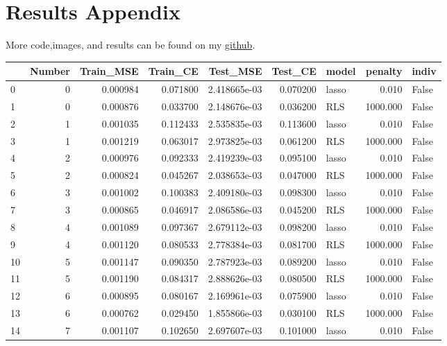 \documentclass[12pt]{article}
\begin{document}
	\section{Results Appendix}
	More code,images, and results can be found on my \href{https://github.com/bogyshi/AMATH563}{github}. 
	\begin{longtable}{lrrrrrlrl}
		\toprule
		{} &  Number &  Train\_MSE &  Train\_CE &      Test\_MSE &   Test\_CE &  model &    penalty &  indiv \\
		\midrule
		0  &       0 &   0.000984 &  0.071800 &  2.418665e-03 &  0.070200 &  lasso &      0.010 &  False \\
		1  &       0 &   0.000876 &  0.033700 &  2.148676e-03 &  0.036200 &    RLS &   1000.000 &  False \\
		2  &       1 &   0.001035 &  0.112433 &  2.535835e-03 &  0.113600 &  lasso &      0.010 &  False \\
		3  &       1 &   0.001219 &  0.063017 &  2.973825e-03 &  0.061200 &    RLS &   1000.000 &  False \\
		4  &       2 &   0.000976 &  0.092333 &  2.419239e-03 &  0.095100 &  lasso &      0.010 &  False \\
		5  &       2 &   0.000824 &  0.045267 &  2.038653e-03 &  0.047000 &    RLS &   1000.000 &  False \\
		6  &       3 &   0.001002 &  0.100383 &  2.409180e-03 &  0.098300 &  lasso &      0.010 &  False \\
		7  &       3 &   0.000865 &  0.046917 &  2.086586e-03 &  0.045200 &    RLS &   1000.000 &  False \\
		8  &       4 &   0.001089 &  0.097367 &  2.679112e-03 &  0.098200 &  lasso &      0.010 &  False \\
		9  &       4 &   0.001120 &  0.080533 &  2.778384e-03 &  0.081700 &    RLS &   1000.000 &  False \\
		10 &       5 &   0.001147 &  0.090350 &  2.787923e-03 &  0.089200 &  lasso &      0.010 &  False \\
		11 &       5 &   0.001190 &  0.084317 &  2.888626e-03 &  0.080500 &    RLS &   1000.000 &  False \\
		12 &       6 &   0.000895 &  0.080167 &  2.169961e-03 &  0.075900 &  lasso &      0.010 &  False \\
		13 &       6 &   0.000762 &  0.029450 &  1.855866e-03 &  0.030100 &    RLS &   1000.000 &  False \\
		14 &       7 &   0.001107 &  0.102650 &  2.697607e-03 &  0.101000 &  lasso &      0.010 &  False \\

\end{longtable}
\end{document}
